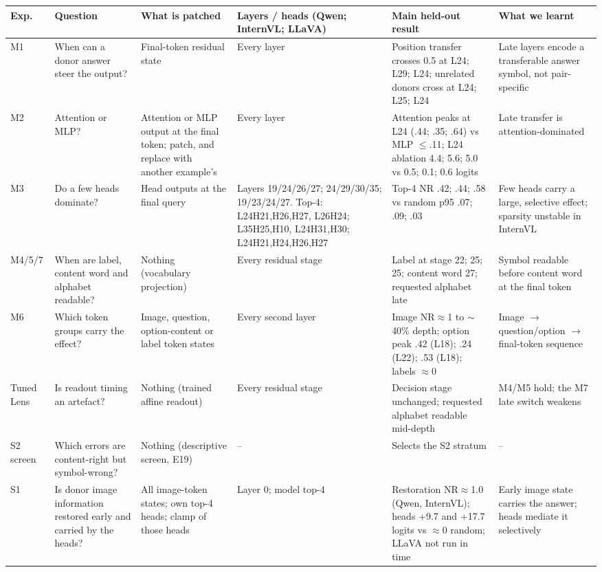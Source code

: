 \documentclass[11pt]{article}
\newcommand{\nr}{\mathrm{NR}}
\begin{document}
\begin{table}[t]
\centering
\scriptsize
\setlength{\tabcolsep}{2.5pt}
\begin{tabularx}{\textwidth}{@{}l>{\raggedright\arraybackslash}p{}>{\raggedright\arraybackslash}p{}>{\raggedright\arraybackslash}p{}>{\raggedright\arraybackslash}X>{\raggedright\arraybackslash}p{}@{}}
\toprule
Exp. & Question & What is patched & Layers / heads (Qwen; InternVL; LLaVA) & Main held-out result & What we learnt \\
\midrule
M1 & When can a donor answer steer the output? & Final-token residual state & Every layer & Position transfer crosses 0.5 at L24; L29; L24; unrelated donors cross at L24; L25; L24 & Late layers encode a transferable answer symbol, not pair-specific \\
M2 & Attention or MLP? & Attention or MLP output at the final token; patch, and replace with another example's & Every layer & Attention peaks at L24 (.44; .35; .64) vs MLP $\le$.11; L24 ablation 4.4; 5.6; 5.0 vs 0.5; 0.1; 0.6 logits & Late transfer is attention-dominated \\
M3 & Do a few heads dominate? & Head outputs at the final query & Layers 19/24/26/27; 24/29/30/35; 19/23/24/27. Top-4: L24H21,H26,H27, L26H24; L35H25,H10, L24H31,H30; L24H21,H24,H26,H27 & Top-4 $\nr$ .42; .44; .58 vs random p95 .07; .09; .03 & Few heads carry a large, selective effect; sparsity unstable in InternVL \\
M4/5/7 & When are label, content word and alphabet readable? & Nothing (vocabulary projection) & Every residual stage & Label at stage 22; 25; 25; content word 27; requested alphabet late & Symbol readable before content word at the final token \\
M6 & Which token groups carry the effect? & Image, question, option-content or label token states & Every second layer & Image $\nr\approx$1 to $\sim$40\% depth; option peak .42 (L18); .24 (L22); .53 (L18); labels $\approx$0 & Image $\to$ question/option $\to$ final-token sequence \\
Tuned Lens & Is readout timing an artefact? & Nothing (trained affine readout) & Every residual stage & Decision stage unchanged; requested alphabet readable mid-depth & M4/M5 hold; the M7 late switch weakens \\
S2 screen & Which errors are content-right but symbol-wrong? & Nothing (descriptive screen, E19) & -- & Selects the S2 stratum & -- \\
S1 & Is donor image information restored early and carried by the heads? & All image-token states; own top-4 heads; clamp of those heads & Layer 0; model top-4 & Restoration $\nr\approx$1.0 (Qwen, InternVL); heads +9.7 and +17.7 logits vs $\approx$0 random; LLaVA not run in time & Early image state carries the answer; heads mediate it selectively \\

\end{tabularx}
\end{table}
\end{document}
